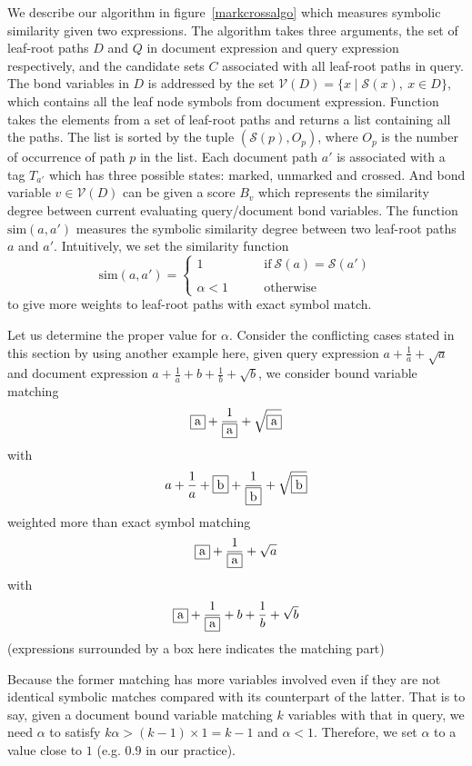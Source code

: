 \documentclass{acm_proc_article-sp}
\begin{document}
We describe our algorithm in figure~\ref{markcrossalgo} which measures symbolic similarity given two expressions. 
The  algorithm takes 
three arguments, the set of leaf-root paths $D$ and $Q$ in document expression and query expression respectively, and the candidate sets $C$ associated with all leaf-root paths in query. 
The bond variables in $D$ is addressed by the set $\mathcal{V}(D) = \{x \mid \mathcal{S}(x),\ x \in D\}$, which contains all the leaf node symbols from document expression.
Function  takes the elements from a set of leaf-root paths and returns a list containing all the paths. 
The list is sorted by the tuple $(\mathcal{S}(p), O_p)$, where $O_p$ is the number of occurrence of path $p$ in the list. 
Each document path $a'$ is associated with a tag $T_{a'}$ which has three possible states: marked, unmarked and crossed. And bond variable $v \in \mathcal{V}(D)$ can be given a score $B_v$ which represents the similarity degree between current evaluating query/document bond variables. 
The function $\mathrm{sim}(a,a')$ measures the symbolic similarity degree between two leaf-root paths $a$ and $a'$. 
Intuitively, we set the similarity function
$$
\mathrm{sim}(a,a') = 
\left\{
\begin{array}{ll}
1    &\qquad \mathrm{if}\  \mathcal{S}(a) = \mathcal{S}(a')
\\
\\
\alpha < 1  &\qquad \mathrm{otherwise}
\end{array}
\right.
$$
to give more weights to leaf-root paths with exact symbol match.

Let us determine the proper value for $\alpha$. 
Consider the conflicting cases stated in this section by using another example here, 
given query expression $a+\frac 1 a + \sqrt{a}$ and document expression $a+\frac 1 a + b + \frac 1 b + \sqrt{b}$, we consider bound variable matching 
$$\fbox{a}+\dfrac 1 {\fbox{a}} + \sqrt{\fbox{a}}$$
with 
$$a+\dfrac 1 a + \fbox{b} + \dfrac 1 {\fbox{b}} + \sqrt{\fbox{b}}$$
weighted more than exact symbol matching 
$$\fbox{a}+\dfrac 1 {\fbox{a}} + \sqrt{a}$$ 
with 
$$\fbox{a}+\dfrac 1 {\fbox{a}} + b + \dfrac 1 b + \sqrt{b}$$
(expressions surrounded by a box here indicates the matching part)

Because the former matching has more variables involved even if they are not identical symbolic matches compared with its counterpart of the latter. 
That is to say, given a document bound variable matching $k$ variables with that in query, we need $\alpha$ to satisfy $ k \alpha > (k-1) \times 1 = k - 1 $
and $\alpha < 1$. 
Therefore, we set $\alpha$ to a value close to $1$ (e.g. $0.9$ in our practice).
\end{document}
